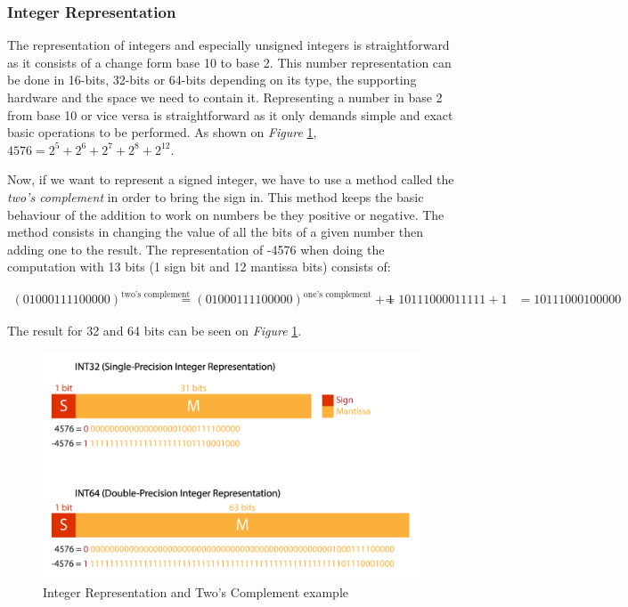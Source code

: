 \subsubsection{Integer Representation}

The representation of integers and especially unsigned integers is straightforward as it consists of a change form base 10 to base 2. This number representation can be done in 16-bits, 32-bits or 64-bits depending on its type, the supporting hardware and the space we need to contain it. Representing a number in base 2 from base 10 or vice versa is straightforward as it only demands simple and exact basic operations to be performed. As shown on \emph{Figure} \ref{fig:IntegerRepr}, $4576 = 2^5 + 2^6 + 2^7 + 2^8 + 2^12$.

Now, if we want to represent a signed integer, we have to use a method called the \emph{two's complement} in order to bring the sign in. This method keeps the basic behaviour of the addition to work on numbers be they positive or negative. The method consists in changing the value of all the bits of a given number then adding one to the result. The representation of -4576 when doing the computation with 13 bits (1 sign bit and 12 mantissa bits) consists of:

\begin{align}
(01000111100000)^\text{two's complement} &= (01000111100000)^\text{one's complement} + 1
                                           &= 10111000011111 + 1
                                           &= 10111000100000
\end{align}

The result for 32 and 64 bits can be seen on \emph{Figure} \ref{fig:IntegerRepr}.

\begin{figure}[htbp]
	\centering
		\includegraphics[width=.8\textwidth]{Figures/IntegerRepr.png}
	\caption[Integer Representation]{Integer Representation and Two's Complement example}
	\label{fig:IntegerRepr}
\end{figure}

